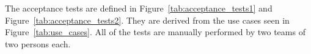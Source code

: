 
The acceptance tests are defined in Figure~\ref{tab:acceptance_tests1} and Figure~\ref{tab:acceptance_tests2}.
They are derived from the use cases seen in Figure~\ref{tab:use_cases}.%
All of the tests are manually performed by two teams of two persons each. \\


